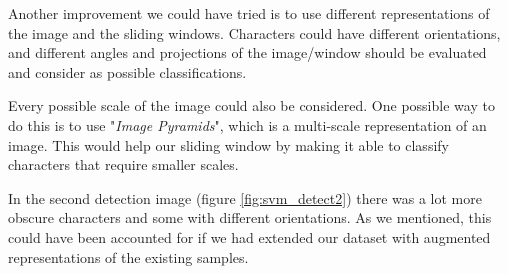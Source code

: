 Another improvement we could have tried is to use different representations of the image and the sliding windows. Characters could have different orientations, and different angles and projections of the image/window should be evaluated and consider as possible classifications. 

Every possible scale of the image could also be considered. One possible way to do this is to use "\textit{Image Pyramids}", which is a multi-scale representation of an image. This would help our sliding window by making it able to classify characters that require smaller scales.

In the second detection image (figure \ref{fig:svm_detect2}) there was a lot more obscure characters and some with different orientations. As we mentioned, this could have been accounted for if we had extended our dataset with augmented representations of the existing samples.
